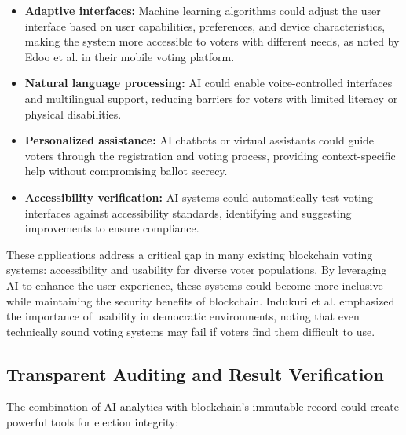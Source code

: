 \documentclass[conference]{IEEEtran}
\begin{document}
\begin{itemize}
    \item \textbf{Adaptive interfaces:} Machine learning algorithms could adjust the user interface based on user capabilities, preferences, and device characteristics, making the system more accessible to voters with different needs, as noted by Edoo et al. \cite{b7} in their mobile voting platform.
    
    \item \textbf{Natural language processing:} AI could enable voice-controlled interfaces and multilingual support, reducing barriers for voters with limited literacy or physical disabilities.
    
    \item \textbf{Personalized assistance:} AI chatbots or virtual assistants could guide voters through the registration and voting process, providing context-specific help without compromising ballot secrecy.
    
    \item \textbf{Accessibility verification:} AI systems could automatically test voting interfaces against accessibility standards, identifying and suggesting improvements to ensure compliance.
\end{itemize}

These applications address a critical gap in many existing blockchain voting systems: accessibility and usability for diverse voter populations. By leveraging AI to enhance the user experience, these systems could become more inclusive while maintaining the security benefits of blockchain. Indukuri et al. \cite{b8} emphasized the importance of usability in democratic environments, noting that even technically sound voting systems may fail if voters find them difficult to use.

\subsection{Transparent Auditing and Result Verification}
The combination of AI analytics with blockchain's immutable record could create powerful tools for election integrity:
\end{document}
